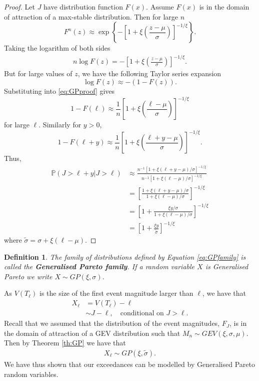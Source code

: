 \documentclass[honours,12pt]{unswthesis}
\newcommand{\PP}{\mathbb{P}}
\newcommand{\1}{\mathbf 1}
\newtheorem{definition}[equation]{Definition}
\numberwithin{equation}{section}
\theoremstyle{definition}
\theoremstyle{remark}
\begin{document}
\begin{proof}\cite{Leadbetter1983}
Let $J$ have distribution function $F(x)$. Assume $F(x)$ is in the domain of attraction of a max-stable distribution. Then for large $n$
\[
	F^n(z)\approx\exp\left\{-\left[1+\xi\left(\frac{z-\mu}{\sigma}\right)\right]^{-1/\xi}\right\}.
\]
Taking the logarithm of both sides
\begin{align}\label{eq:GPproof}
	n \log F(z) = -\left[1+\xi\left(\frac{z-\mu}{\sigma}\right)\right]^{-1/\xi}.
\end{align}
But for large values of $z$, we have the following Taylor series expansion
\[
	\log F(z)\approx -(1-F(z)).
\]
Substituting into \ref{eq:GPproof} gives
\[
	1-F(\ell) \approx \frac{1}{n}\left[1+\xi\left(\frac{\ell-\mu}{\sigma}\right)\right]^{-1/\xi}
\]
for large $\ell$. Similarly for $y>0$,
\[
	1-F(\ell+y) \approx \frac{1}{n}\left[1+\xi\left(\frac{\ell+y-\mu}{\sigma}\right)\right]^{-1/\xi}.
\]
Thus,
\begin{align*}
	\PP(J>\ell+y|J>\ell) &\approx \frac{n^{-1}[1+\xi(\ell+y-\mu)/\sigma]^{-1/\xi}}{n^{-1}[1+\xi(\ell-\mu)/\sigma]^{-1/\xi}}\\
	&=\left[\frac{1+\xi(\ell+y-\mu)/\sigma}{1+\xi(\ell-\mu)/\sigma}\right]^{-1/\xi}\\
	&=\left[1+\frac{\xi y/\sigma}{1+\xi(\ell-\mu)/\sigma}\right]^{-1/\xi}\\
	&=\left[1+\frac{\xi y}{\tilde \sigma}\right]^{-1/\xi}
\end{align*}
where $\tilde\sigma=\sigma+\xi(\ell-\mu)$.
\end{proof}

\begin{definition}
The family of distributions defined by Equation \ref{eq:GPfamily} is called the \textbf{Generalised Pareto family}. If a random variable $X$ is Generalised Pareto we write $X\sim GP(\xi,\sigma)$.\\
\end{definition}
\noindent As $V(T_\ell)$ is the size of the first event magnitude larger than $\ell$, we have that
\begin{align*}
	X_\ell&=V(T_\ell)-\ell\\
		  &\sim J-\ell, \quad \textrm{conditional on $J>\ell$}.
\end{align*}
Recall that we assumed that the distribution of the event magnitudes, $F_J$, is in the domain of attraction of a GEV distribution such that $M_n \sim GEV(\xi,\sigma,\mu)$. Then by Theorem \ref{th:GP} we have that 
\begin{align}\label{eq:GPdist}
X_\ell\sim GP(\xi,\tilde \sigma).
\end{align}
We have thus shown that our exceedances can be modelled by Generalised Pareto random variables.
\end{document}
